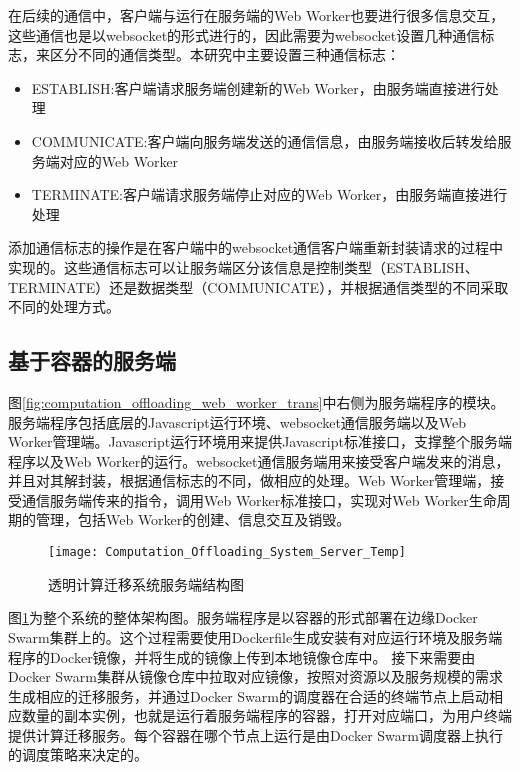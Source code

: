 在后续的通信中，客户端与运行在服务端的Web Worker也要进行很多信息交互，这些通信也是以websocket的形式进行的，因此需要为websocket设置几种通信标志，来区分不同的通信类型。本研究中主要设置三种通信标志：
\begin{itemize}
    \item ESTABLISH:客户端请求服务端创建新的Web Worker，由服务端直接进行处理
    \item COMMUNICATE:客户端向服务端发送的通信信息，由服务端接收后转发给服务端对应的Web Worker
    \item TERMINATE:客户端请求服务端停止对应的Web Worker，由服务端直接进行处理
\end{itemize}

添加通信标志的操作是在客户端中的websocket通信客户端重新封装请求的过程中实现的。这些通信标志可以让服务端区分该信息是控制类型（ESTABLISH、TERMINATE）还是数据类型（COMMUNICATE），并根据通信类型的不同采取不同的处理方式。

\subsection{基于容器的服务端}

图\ref{fig:computation_offloading_web_worker_trans}中右侧为服务端程序的模块。服务端程序包括底层的Javascript运行环境、websocket通信服务端以及Web Worker管理端。Javascript运行环境用来提供Javascript标准接口，支撑整个服务端程序以及Web Worker的运行。websocket通信服务端用来接受客户端发来的消息，并且对其解封装，根据通信标志的不同，做相应的处理。Web Worker管理端，接受通信服务端传来的指令，调用Web Worker标准接口，实现对Web Worker生命周期的管理，包括Web Worker的创建、信息交互及销毁。

\begin{figure}[!htbp]
    \centering
    \texttt{[image: Computation\_Offloading\_System\_Server\_Temp]}
    \caption{透明计算迁移系统服务端结构图}
    \label{fig:computation_offloading_system_server}
\end{figure}

图\ref{fig:computation_offloading_system_server}为整个系统的整体架构图。服务端程序是以容器的形式部署在边缘Docker Swarm集群上的。这个过程需要使用Dockerfile生成安装有对应运行环境及服务端程序的Docker镜像，并将生成的镜像上传到本地镜像仓库中。
接下来需要由Docker Swarm集群从镜像仓库中拉取对应镜像，按照对资源以及服务规模的需求生成相应的迁移服务，并通过Docker Swarm的调度器在合适的终端节点上启动相应数量的副本实例，也就是运行着服务端程序的容器，打开对应端口，为用户终端提供计算迁移服务。每个容器在哪个节点上运行是由Docker Swarm调度器上执行的调度策略来决定的。

